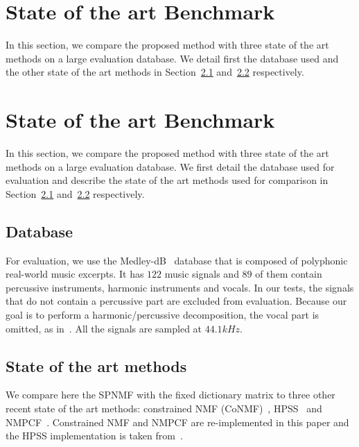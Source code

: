 
\section{State of the art Benchmark}
\label{sec:stateoftheart}

In this section, we compare the proposed method with three state of the art methods on a large evaluation database. We detail first the database used and the other state of the art methods in Section~\ref{database} and~\ref{soth} respectively.  


\section{State of the art Benchmark}
\label{sec:stateoftheart}

In this section, we compare the proposed method with three state of the art methods on a large evaluation database. We first detail the database used for evaluation and describe the state of the art methods used for comparison in Section~\ref{database} and~\ref{soth} respectively.  


\subsection{Database}
\label{database}

For evaluation, we use the Medley-dB~\cite{bittner2014medleydb} database that is composed of polyphonic real-world music excerpts. It has $122$ music signals and $89$ of them contain percussive instruments, harmonic instruments and vocals. In our tests, the signals that do not contain a percussive part are excluded from evaluation. Because our goal is to perform a harmonic/percussive decomposition, the vocal part is omitted, as in~\cite{canadas2014percussive}. All the signals are sampled at $44.1kHz$.

\subsection{State of the art methods}
\label{soth}

We compare here the SPNMF with the fixed dictionary matrix to three other recent state of the art methods: constrained NMF (CoNMF)~\cite{canadas2014percussive}, HPSS~\cite{fitzgerald2010harmonic} and NMPCF~\cite{kim2011nonnegative}. Constrained NMF and NMPCF are re-implemented in this paper and the HPSS implementation is taken from~\cite{DriedgerMueller14_TSMToolbox_DAFX}.

